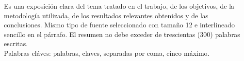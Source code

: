 \begin{resumen}
     Es una exposici\'on clara del tema tratado en el trabajo, de los objetivos, de la metodolog\'ia utilizada, de los resultados relevantes obtenidos y de las conclusiones. Mismo tipo de fuente seleccionado con tamaño 12 e interlineado sencillo en el p\'arrafo. El resumen no debe exceder de trescientas (300) palabras escritas. \\
     Palabras cl\'aves: palabras, claves, separadas por coma, cinco m\'aximo.
\end{resumen}